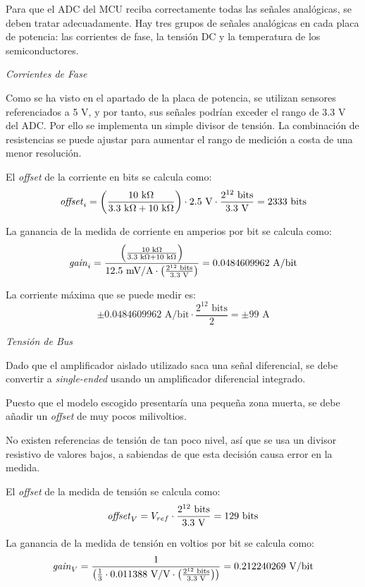 Para que el ADC del MCU reciba correctamente todas las señales analógicas, se deben tratar adecuadamente. Hay tres grupos de señales analógicas en cada placa de potencia: las corrientes de fase, la tensión DC y la temperatura de los semiconductores.

\textit{Corrientes de Fase}

Como se ha visto en el apartado de la placa de potencia, se utilizan sensores referenciados a 5 V, y por tanto, sus señales podrían exceder el rango de 3.3 V del ADC. Por ello se implementa un simple divisor de tensión. La combinación de resistencias se puede ajustar para aumentar el rango de medición a costa de una menor resolución. 

El \textit{offset} de la corriente en bits se calcula como:
\[ \text{\textit{offset}}_i = \left(\frac{10 \text{ k}\Omega}{3.3\text{ k}\Omega+10\text{ k}\Omega}\right) \cdot 2.5 \text{ V} \cdot \frac{2^{12} \text{ bits}}{3.3\text{ V}} = 2333 \text{ bits} \]

La ganancia de la medida de corriente en amperios por bit se calcula como:
\[ \text{\textit{gain}}_i = \frac{\left(\frac{10\text{ k}\Omega}{3.3\text{ k}\Omega+10\text{ k}\Omega}\right)}{12.5 \text{ mV/A} \cdot \left(\frac{2^{12} \text{ bits}}{3.3\text{ V}}\right)} = 0.0484609962 \text{ A/bit} \]

La corriente máxima que se puede medir es:
\[ \pm 0.0484609962 \text{ A/bit} \cdot \frac{2^{12} \text{ bits}}{2} = \pm 99 \text{ A} \]

\textit{Tensión de Bus}

Dado que el amplificador aislado utilizado saca una señal diferencial, se debe convertir a \textit{single-ended} usando un amplificador diferencial integrado. 

Puesto que el modelo escogido presentaría una pequeña zona muerta, se debe añadir un \textit{offset} de muy pocos milivoltios. 

No existen referencias de tensión de tan poco nivel, así que se usa un divisor resistivo de valores bajos, a sabiendas de que esta decisión causa error en la medida. 

El \textit{offset} de la medida de tensión se calcula como:
\[ \text{\textit{offset}}_V = V_{ref} \cdot \frac{2^{12} \text{ bits}}{3.3\text{ V}} = 129 \text{ bits} \]

La ganancia de la medida de tensión en voltios por bit se calcula como:
\[ \text{\textit{gain}}_V = \frac{1}{\left(\frac{1}{3} \cdot 0.011388 \text{ V/V} \cdot \left(\frac{2^{12} \text{ bits}}{3.3\text{ V}}\right)\right)} = 0.212240269 \text{ V/bit} \]

